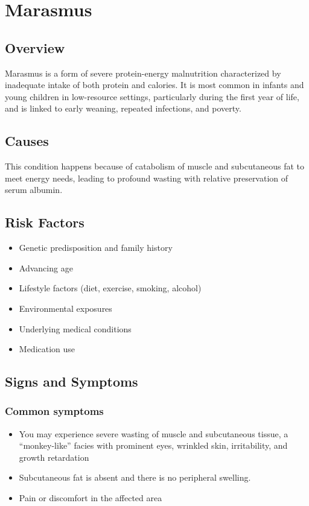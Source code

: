 \chapter{Marasmus}
\label{sec:Marasmus}

\section{Overview}
Marasmus is a form of severe protein-energy malnutrition characterized by inadequate intake of both protein and calories. It is most common in infants and young children in low-resource settings, particularly during the first year of life, and is linked to early weaning, repeated infections, and poverty.
\section{Causes}
This condition happens because of catabolism of muscle and subcutaneous fat to meet energy needs, leading to profound wasting with relative preservation of serum albumin.     
\section{Risk Factors}

\begin{itemize}[noitemsep]
  \item Genetic predisposition and family history
  \item Advancing age
  \item Lifestyle factors (diet, exercise, smoking, alcohol)
  \item Environmental exposures
  \item Underlying medical conditions
  \item Medication use
\end{itemize}
\section{Signs and Symptoms}

\subsection{Common symptoms}
\begin{itemize}[noitemsep]
  \item You may experience severe wasting of muscle and subcutaneous tissue, a ``monkey-like'' facies with prominent eyes, wrinkled skin, irritability, and growth retardation
  \item Subcutaneous fat is absent and there is no peripheral swelling.
  \item Pain or discomfort in the affected area
  \end{itemize}

